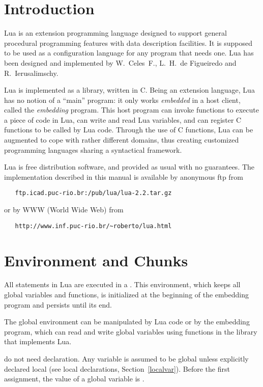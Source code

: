 \section{Introduction}

Lua is an extension programming language designed to support
general procedural programming features with data description
facilities.
It is supposed to be used as a configuration language for any
program that needs one.
Lua has been designed and implemented by
W.~Celes~F., L.~H.~de Figueiredo and R.~Ierusalimschy.

Lua is implemented as a library, written in C.
Being an extension language, Lua has no notion of a ``main'' program:
it only works {\em embedded} in a host client,
called the {\em embedding} program.
This host program can invoke functions to execute a piece of
code in Lua, can write and read Lua variables,
and can register C functions to be called by Lua code.
Through the use of C functions, Lua can be augmented to cope with
rather different domains,
thus creating customized programming languages sharing a syntactical framework.

Lua is free distribution software,
and provided as usual with no guarantees.
The implementation described in this manual is available
by anonymous ftp from
\begin{verbatim}
   ftp.icad.puc-rio.br:/pub/lua/lua-2.2.tar.gz
\end{verbatim}
or by WWW (World Wide Web) from
\begin{verbatim}
   http://www.inf.puc-rio.br/~roberto/lua.html
\end{verbatim}


\section{Environment and Chunks}

All statements in Lua are executed in a .
This environment, which keeps all global variables and functions,
is initialized at the beginning of the embedding program and
persists until its end.

The global environment can be manipulated by Lua code or
by the embedding program,
which can read and write global variables
using functions in the library that implements Lua.

 do not need declaration.
Any variable is assumed to be global unless explicitly declared local
(see local declarations, Section~\ref{localvar}).
Before the first assignment, the value of a global variable is \nil.

